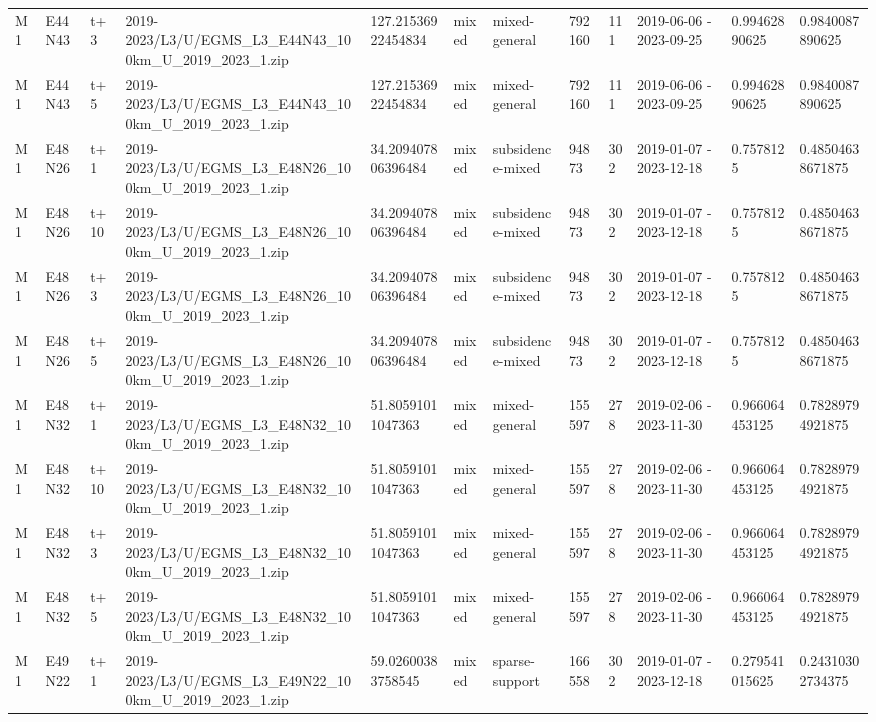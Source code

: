 \begin{landscape}
\begin{longtable}{llllllllllll}
M1 & E44N43 & t+3 & 2019-2023/L3/U/EGMS\_L3\_E44N43\_100km\_U\_2019\_2023\_1.zip & 127.21536922454834 & mixed & mixed-general & 792160 & 111 & 2019-06-06 - 2023-09-25 & 0.99462890625 & 0.9840087890625 \\
M1 & E44N43 & t+5 & 2019-2023/L3/U/EGMS\_L3\_E44N43\_100km\_U\_2019\_2023\_1.zip & 127.21536922454834 & mixed & mixed-general & 792160 & 111 & 2019-06-06 - 2023-09-25 & 0.99462890625 & 0.9840087890625 \\
M1 & E48N26 & t+1 & 2019-2023/L3/U/EGMS\_L3\_E48N26\_100km\_U\_2019\_2023\_1.zip & 34.209407806396484 & mixed & subsidence-mixed & 94873 & 302 & 2019-01-07 - 2023-12-18 & 0.7578125 & 0.48504638671875 \\
M1 & E48N26 & t+10 & 2019-2023/L3/U/EGMS\_L3\_E48N26\_100km\_U\_2019\_2023\_1.zip & 34.209407806396484 & mixed & subsidence-mixed & 94873 & 302 & 2019-01-07 - 2023-12-18 & 0.7578125 & 0.48504638671875 \\
M1 & E48N26 & t+3 & 2019-2023/L3/U/EGMS\_L3\_E48N26\_100km\_U\_2019\_2023\_1.zip & 34.209407806396484 & mixed & subsidence-mixed & 94873 & 302 & 2019-01-07 - 2023-12-18 & 0.7578125 & 0.48504638671875 \\
M1 & E48N26 & t+5 & 2019-2023/L3/U/EGMS\_L3\_E48N26\_100km\_U\_2019\_2023\_1.zip & 34.209407806396484 & mixed & subsidence-mixed & 94873 & 302 & 2019-01-07 - 2023-12-18 & 0.7578125 & 0.48504638671875 \\
M1 & E48N32 & t+1 & 2019-2023/L3/U/EGMS\_L3\_E48N32\_100km\_U\_2019\_2023\_1.zip & 51.80591011047363 & mixed & mixed-general & 155597 & 278 & 2019-02-06 - 2023-11-30 & 0.966064453125 & 0.78289794921875 \\
M1 & E48N32 & t+10 & 2019-2023/L3/U/EGMS\_L3\_E48N32\_100km\_U\_2019\_2023\_1.zip & 51.80591011047363 & mixed & mixed-general & 155597 & 278 & 2019-02-06 - 2023-11-30 & 0.966064453125 & 0.78289794921875 \\
M1 & E48N32 & t+3 & 2019-2023/L3/U/EGMS\_L3\_E48N32\_100km\_U\_2019\_2023\_1.zip & 51.80591011047363 & mixed & mixed-general & 155597 & 278 & 2019-02-06 - 2023-11-30 & 0.966064453125 & 0.78289794921875 \\
M1 & E48N32 & t+5 & 2019-2023/L3/U/EGMS\_L3\_E48N32\_100km\_U\_2019\_2023\_1.zip & 51.80591011047363 & mixed & mixed-general & 155597 & 278 & 2019-02-06 - 2023-11-30 & 0.966064453125 & 0.78289794921875 \\
M1 & E49N22 & t+1 & 2019-2023/L3/U/EGMS\_L3\_E49N22\_100km\_U\_2019\_2023\_1.zip & 59.02600383758545 & mixed & sparse-support & 166558 & 302 & 2019-01-07 - 2023-12-18 & 0.279541015625 & 0.24310302734375 \\

\end{longtable}
\end{landscape}
